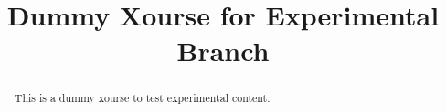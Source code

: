 \documentclass{xourse}
\title{Dummy Xourse for Experimental Branch}
\begin{document}
\begin{abstract}
    This is a dummy xourse to test experimental content.
\end{abstract}
\maketitle

\end{document}
